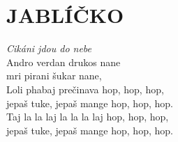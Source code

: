 \section*{\Huge JABLÍČKO}
\emph{Cikáni jdou do nebe}\\

Andro verdan drukos nane\\
mri pirani šukar nane,\\

Loli phabaj prečinava hop, hop, hop,\\
jepaš tuke, jepaš mange hop, hop, hop.\\

Taj la la laj la \hspace{0,8cm}la la laj hop, hop, hop,\\
jepaš tuke, jepaš mange hop, hop, hop.

\newpage
